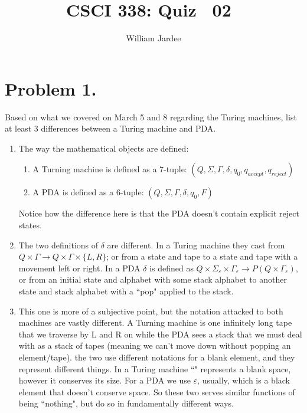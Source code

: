 \documentclass[11pt]{article}
\title{CSCI 338: Quiz ~02~}
\author{William Jardee}
\date{}
\begin{document}
\maketitle

\section*{Problem 1.}

Based on what we covered on March 5 and 8 regarding the Turing machines, list at least 3 differences between a Turing machine and PDA.

\begin{enumerate}
    \item The way the mathematical objects are defined:
\begin{enumerate}
    \item A Turning machine is defined as a 7-tuple: $(Q, \Sigma, \Gamma, \delta, q_0, q_{accept}, q_{reject})$
    \item A PDA is defined as a 6-tuple: $(Q, \Sigma, \Gamma, \delta, q_0, F)$
\end{enumerate}
    Notice how the difference here is that the PDA doesn't contain explicit reject states.
    
    \item The two definitions of $\delta$ are different. In a Turing machine they cast from $Q \times \Gamma \rightarrow Q \times \Gamma \times \{L, R\}$; or from a state and tape to a state and tape with a movement left or right. In a PDA $\delta$ is defined as $Q \times \Sigma_\varepsilon \times \Gamma_\varepsilon \rightarrow P( Q \times \Gamma_\varepsilon)$, or from an initial state and alphabet with some stack alphabet to another state and stack alphabet with a ``pop" applied to the stack. 
    
    \item This one is more of a subjective point, but the notation attacked to both machines are vastly different. A Turning machine is one infinitely long tape that we traverse by L and R on while the PDA sees a stack that we must deal with as a stack of tapes (meaning we can't move down without popping an element/tape). the two use different notations for a blank element, and they represent different things. In a Turing machine ``\textvisiblespace" represents a blank space, however it conserves its size. For a PDA we use $\varepsilon$, usually, which is a black element that doesn't conserve space. So these two serves similar functions of being ``nothing", but do so in fundamentally different ways. 
    
\end{enumerate}    
\end{document}
